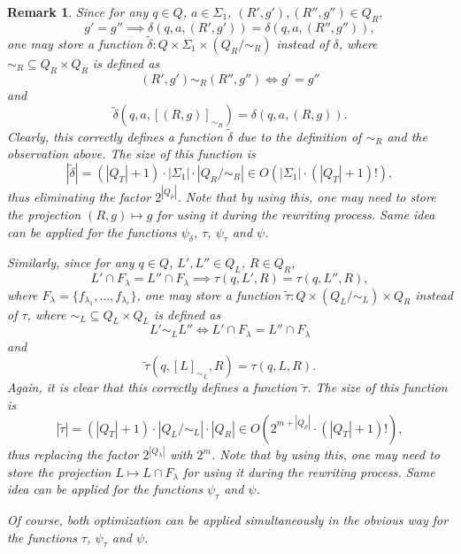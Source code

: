 \documentclass{article}
\newtheorem{remark}[definition]{Remark}
\newcommand{\len}[1]{\ensuremath{\left| #1 \right|}}
\begin{document}
	\begin{remark} \label{remark:factorize_set_of_states}
		Since for any $q\in Q$, $a\in\Sigma_1$, $(R', g'), (R'', g'')\in Q_R$,
		\[ g'=g'' \implies \delta(q, a, (R', g')) = \delta(q, a, (R'', g'')), \]
		one may store a function $\tilde{\delta}: Q\times\Sigma_1\times(Q_R/{\sim_R})$ instead of $\delta$, where
		$\sim_R\subseteq Q_R\times Q_R$ is defined as
		\[ (R', g') \sim_R (R'', g'') \iff g' = g'' \]
		and
		\[ \tilde{\delta}(q, a, [(R, g)]_{\sim_R}) = \delta(q, a, (R, g)). \]
		Clearly, this correctly defines a function $\tilde{\delta}$ due to the definition of $\sim_R$ and the observation above.
		The size of this function is
		\[ \len{\tilde{\delta}} = (\len{Q_T}+1)\cdot\len{\Sigma_1}\cdot\len{Q_R/{\sim_R}} \in O(\len{\Sigma_1}\cdot(\len{Q_T}+1)!), \]
		thus eliminating the factor $2^{\len{Q_\rho}}$.
		Note that by using this, one may need to store the projection $(R, g)\mapsto g$ for using it during the rewriting process.
		Same idea can be applied for the functions $\psi_\delta$, $\tau$, $\psi_\tau$ and $\psi$.
		
		Similarly, since for any $q\in Q$, $L', L''\in Q_L$, $R\in Q_R$,
		\[ L' \cap F_\lambda = L'' \cap F_\lambda \implies \tau(q, L', R) = \tau(q, L'', R), \]
		where $F_\lambda = \{ f_{\lambda_1}, \ldots, f_{\lambda_r} \}$, one may store a function $\tilde{\tau}: Q\times(Q_L/\sim_L)\times Q_R$ instead of $\tau$, where $\sim_L\subseteq Q_L\times Q_L$ is defined as
		\[ L' \sim_L L'' \iff L' \cap F_\lambda = L'' \cap F_\lambda \]
		and
		\[ \tilde{\tau}(q, [L]_{\sim_L}, R) = \tau(q, L, R). \]
		Again, it is clear that this correctly defines a function $\tilde{\tau}$.
		The size of this function is
		\[ \len{\tilde{\tau}} = (\len{Q_T}+1)\cdot\len{Q_L/{\sim_L}}\cdot\len{Q_R} \in O(2^{m+\len{Q_\rho}}\cdot(\len{Q_T}+1)!), \]
		thus replacing the factor $2^{\len{Q_\lambda}}$ with $2^m$.
		Note that by using this, one may need to store the projection $L\mapsto L\cap F_\lambda$ for using it during the rewriting process. Same idea can be applied for the functions $\psi_\tau$ and $\psi$.
		
		Of course, both optimization can be applied simultaneously in the obvious way for the functions $\tau$, $\psi_\tau$ and $\psi$.
	\end{remark}
\end{document}
